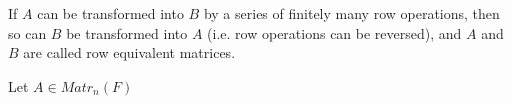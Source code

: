 \begin{definition}
    If $A$ can be transformed into $B$ by a series of finitely many row operations, then so can $B$ be transformed into $A$ (i.e. row operations can be reversed), and $A$ and $B$ are called row equivalent matrices.
\end{definition}

\begin{definition}
    Let $A \in Matr_n(F)$
\end{definition}







